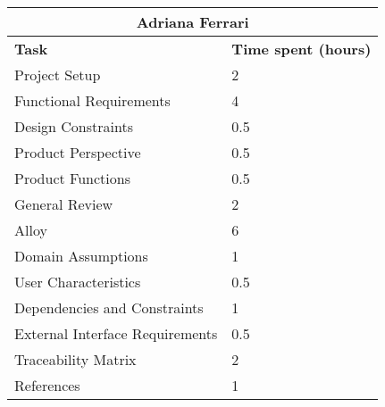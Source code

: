 \begin{table}[H]
  \center
  \begin{tabular}{l|l}
    \multicolumn{2}{c}{\textbf{Adriana Ferrari}} \\
    \hline
    \textbf{Task} & \textbf{Time spent (hours)}\\
    \hline
    Project Setup & 2 \\
    Functional Requirements & 4 \\
    Design Constraints & 0.5 \\
    Product Perspective & 0.5 \\
    Product Functions & 0.5 \\
    General Review & 2 \\
    Alloy & 6 \\
    Domain Assumptions & 1 \\
    User Characteristics & 0.5 \\
    Dependencies and Constraints & 1 \\
    External Interface Requirements & 0.5 \\
    Traceability Matrix & 2 \\
    References & 1 \\
  \end{tabular}
\end{table}